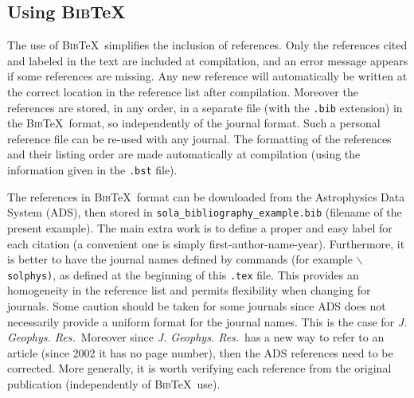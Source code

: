 \documentclass[namedreferences,hyperref,optionalrh]{spr-sola}
\newcommand{\BibTeX}{\textsc{Bib}\TeX}
\newcommand{\jgr}{{\it J. Geophys. Res.}}
\begin{document}
\subsection{Using \BibTeX} %
\label{S-BibTeX}
  The use of \BibTeX\ simplifies the inclusion of references. Only the 
references cited and labeled in the text are included at compilation, 
and an error message appears if some references
are missing.  Any new reference will automatically be written at the correct 
location in the reference list after compilation. 
Moreover the references are stored, in any order, in a separate file
(with the \texttt{.bib} extension) in the \BibTeX\ format, so independently of 
the journal format. Such a personal reference file can be re-used with any journal.
The formatting of the references and their listing order are made automatically
at compilation (using the information given in the \texttt{.bst} file). 
        
  The references in \BibTeX\ format can be downloaded from the 
Astrophysics Data System (ADS), then stored
in \verb+sola_bibliography_example.bib+ (file\linebreak name of the present example).
The main extra work is to define a proper and easy label for each citation
(a convenient one is simply first-author-name-year).  Furthermore, it is better
to have the journal names defined by commands (for example 
\texttt{$\backslash$solphys)}, as defined at the beginning of 
this \texttt{.tex} file.
This provides an homogeneity in the reference list and permits flexibility
when changing for journals.   Some caution should be taken for some journals
since ADS does not necessarily provide a uniform format for the
journal names. This is the case for \jgr\  Moreover since
\jgr\ has a new way to refer to an article 
(since 2002 it has no page number), then the ADS references need to be corrected. 
More generally, it is worth verifying
each reference from the original publication (independently of \BibTeX\ use).
\end{document}
